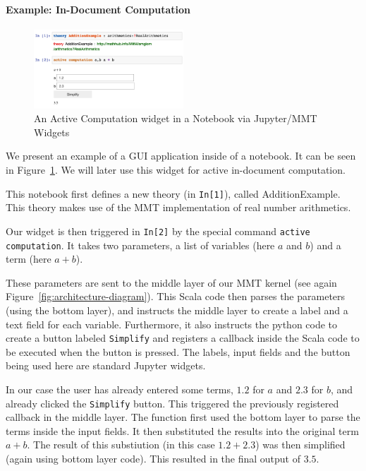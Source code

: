 \paragraph*{Example: In-Document Computation}

\begin{figure}
  \vspace{-10pt}
  \includegraphics[width=0.5\textwidth]{screenshots/activecomp}
  \caption{An Active Computation widget in a Notebook via Jupyter/MMT Widgets}\label{fig:ac}
  \vspace{-20pt}
\end{figure}
We present an example of a GUI application inside of a notebook. 
It can be seen in Figure~\ref{fig:ac}.
We will later use this widget for active in-document computation. 

This notebook first defines a new theory (in \texttt{In[1]}), called AdditionExample.
This theory makes use of the MMT implementation of real number arithmetics.  

Our widget is then triggered in \texttt{In[2]} by the special command \texttt{active computation}. 
It takes two parameters, a list of variables (here $a$ and $b$) and a term (here $a + b$). 

These parameters are sent to the middle layer of our MMT kernel (see again Figure~\ref{fig:architecture-diagram}). 
This Scala code then parses the parameters (using the bottom layer), and instructs the middle layer to create a label and a text field for each variable. 
Furthermore, it also instructs the python code to create a button labeled \texttt{Simplify} and registers a callback inside the Scala code to be executed when the button is pressed. 
The labels, input fields and the button being used here are standard Jupyter widgets. 

In our case the user has already entered some terms, $1.2$ for $a$ and $2.3$ for $b$, and already clicked the \texttt{Simplify} button. 
This triggered the previously registered callback in the middle layer. 
The function first used the bottom layer to parse the terms inside the input fields. 
It then substituted the results into the original term $a + b$. 
The result of this substiution (in this case $1.2 + 2.3$) was then simplified (again using bottom layer code). 
This resulted in the final output of $3.5$. 


